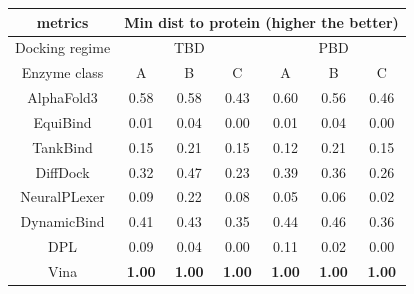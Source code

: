 \documentclass[12pt, a4paper, portrait]{article}
\begin{document}
    \begin{table}
        \begin{tabular}{|c|*{6}{c}|}
            \hline
            metrics & 
            \multicolumn{6}{|c|}{Min dist to protein (\textbf{higher} the better)} \\
            \hline

            Docking regime & 
            \multicolumn{3}{|c|}{TBD} & \multicolumn{3}{|c|}{PBD} \\
            \hline

            Enzyme class & A & B & C & A & B & C \\
            \hline
            AlphaFold3&0.58&0.58&0.43&0.60&0.56&0.46\\ 
            EquiBind&0.01&0.04&0.00&0.01&0.04&0.00\\ 
            TankBind&0.15&0.21&0.15&0.12&0.21&0.15\\ 
            DiffDock&0.32&0.47&0.23&0.39&0.36&0.26\\ 
            NeuralPLexer&0.09&0.22&0.08&0.05&0.06&0.02\\ 
            DynamicBind&0.41&0.43&0.35&0.44&0.46&0.36\\ 
            DPL&0.09&0.04&0.00&0.11&0.02&0.00\\ 
            \hline
            Vina&\textbf{1.00}&\textbf{1.00}&\textbf{1.00}&\textbf{1.00}&\textbf{1.00}&\textbf{1.00}\\ 
            \hline

        \end{tabular}
    \end{table}
\end{document}
